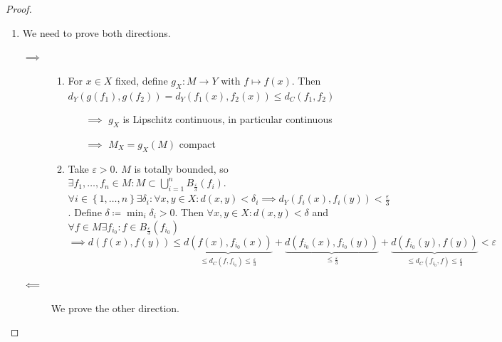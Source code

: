 \documentclass[a4paper]{article}
\numberwithin{lecref}{section}
\newcommand{\Abs}[1]{\left|#1\right|}
\newcommand{\Set}[1]{\left\{#1\right\}}
\begin{document}
\begin{proof}
\begin{enumerate}
			In general, we have $\forall x, y, z \in (Z, d_Z)$ with $d_Z$ as a metric.
			\[ \Abs{d(x, z) - d(y, z)} \leq d(x, y) \]
			\begin{proof}
				\begin{align}
					d(x, z) &\leq d(x, y) + d(y, z) \implies d(x, z) - d(y, z) \leq d(x, y) \label{a} \\
					d(y, z) &\leq d(y, x) + d(x, z) \implies d(y, z) - d(x, z) \leq d(x, y) \label{b} \\
					\eqref{a} \text{ and } \eqref{b} &\implies \Abs{d(x, z) - d(y, z)} \leq d(x, y)
				\end{align}
			\end{proof}
			Consequently, $\forall z \in Z$, $x_n \to x$ in $Z$: $d(x_n, z) \to d(x, z)$
			since $\Abs{d(x_n, z) - d(x, z)} \leq d(x_n, x) \to 0$.

		\item We need to prove both directions.

			\begin{description}
				\item[$\implies$]
					\begin{enumerate}
						\item For $x \in X$ fixed, define $g_X: M \to Y$ with $f \mapsto f(x)$.
							Then $d_Y(g(f_1), g(f_2)) = d_Y(f_1(x), f_2(x)) \leq d_C(f_1, f_2)$
							\begin{itemize}
								\item[$\implies$] $g_X$ is Lipschitz continuous, in particular continuous
								\item[$\implies$] $M_X = g_X(M)$ compact
							\end{itemize}

						\item Take $\varepsilon > 0$. $M$ is totally bounded, so $\exists f_1, \dots, f_n \in M: M \subset \bigcup_{i=1}^n B_{\frac\varepsilon3}(f_i)$.
							$\forall i \in \Set{1, \dots, n} \exists \delta_i: \forall x, y \in X: d(x, y) < \delta_i \implies d_Y(f_i(x), f_i(y)) < \frac\varepsilon3$.
							Define $\delta \coloneqq \min_i \delta_i > 0$. Then $\forall x, y \in X: d(x, y) < \delta$ and $\forall f \in M \exists f_{i_0}: f \in B_{\frac\varepsilon3}(f_{i_0})$
							\[ \implies d(f(x), f(y)) \leq \underbrace{d(f(x), f_{i_0}(x))}_{\leq d_C(f, f_{i_0}) \leq \frac\varepsilon3} + \underbrace{d(f_{i_0}(x), f_{i_0}(y))}_{\leq \frac\varepsilon3} + \underbrace{d(f_{i_0}(y), f(y))}_{\leq d_C(f_{i_0}, f) \leq \frac\varepsilon3} < \varepsilon \]
					\end{enumerate}
				\item[$\impliedby$]
					We prove the other direction.


\end{description}
\end{enumerate}
\end{proof}
\end{document}
